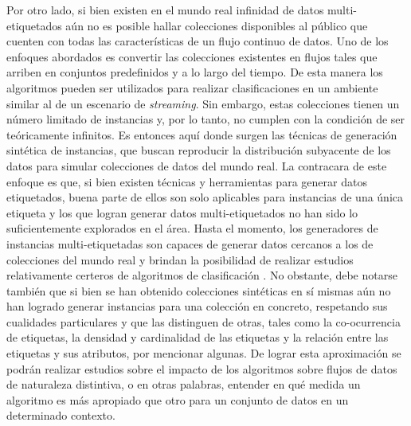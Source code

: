 Por otro lado, si bien existen en el mundo real infinidad de datos
multi-etiquetados aún no es posible hallar colecciones disponibles al público
que cuenten con todas las características de un flujo continuo de datos. Uno de
los enfoques abordados es convertir las colecciones existentes en flujos tales
que arriben en conjuntos predefinidos y a lo largo del tiempo. De esta manera
los algoritmos pueden ser utilizados para realizar clasificaciones en un
ambiente similar al de un escenario de \textit{streaming}. Sin embargo, estas
colecciones tienen un número limitado de instancias y, por lo tanto, no cumplen
con la condición de ser teóricamente infinitos. Es entonces aquí donde surgen
las técnicas de generación sintética de instancias, que buscan reproducir la
distribución subyacente de los datos para simular colecciones de datos del mundo
real. La contracara de este enfoque es que, si bien existen técnicas y
herramientas para generar datos etiquetados, buena parte de ellos son solo
aplicables para instancias de una única etiqueta y los que logran generar datos
multi-etiquetados no han sido lo suficientemente explorados en el área. Hasta el
momento, los generadores de instancias multi-etiquetadas son capaces de generar
datos cercanos a los de colecciones del mundo real \cite{read_generating_2009} y
brindan la posibilidad de realizar estudios relativamente certeros de algoritmos
de clasificación \cite{read_scalable_2012}. No obstante, debe notarse también
que si bien se han obtenido colecciones sintéticas en sí mismas aún no han
logrado generar instancias para una colección en concreto, respetando sus
cualidades particulares y que las distinguen de otras, tales como la
co-ocurrencia de etiquetas, la densidad y cardinalidad de las etiquetas y la
relación entre las etiquetas y sus atributos, por mencionar algunas. De lograr
esta aproximación se podrán realizar estudios sobre el impacto de los algoritmos
sobre flujos de datos de naturaleza distintiva, o en otras palabras, entender en
qué medida un algoritmo es más apropiado que otro para un conjunto de datos en
un determinado contexto.

